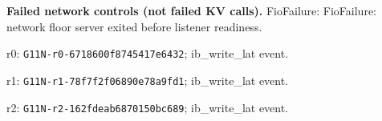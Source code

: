 \small\textbf{Failed network controls (not failed KV calls).}
FioFailure: FioFailure: network floor server exited before listener readiness.
\par r0: \texttt{G11N-r0-6718600f8745417e6432}; ib\_write\_lat event.
\par r1: \texttt{G11N-r1-78f7f2f06890e78a9fd1}; ib\_write\_lat event.
\par r2: \texttt{G11N-r2-162fdeab6870150bc689}; ib\_write\_lat event.\normalsize
